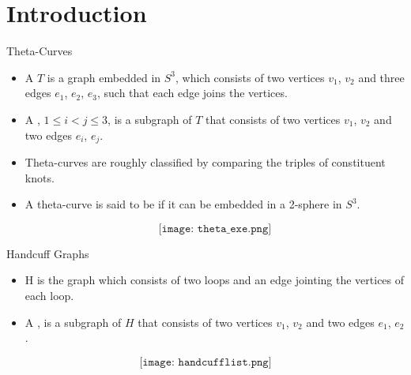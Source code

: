 \section{Introduction}
\begin{frame}{Theta-Curves}
	\begin{itemize}
		\item A  $T$ is a graph embedded in $S^3$,
		which consists of two vertices $v_1$, $v_2$
		and three edges $e_1$, $e_2$, $e_3$,
		such that each edge joins the vertices.
		\item A , $1 \le i < j \le 3$, is a subgraph of $T$
		that consists of two vertices $v_1$, $v_2$ and two edges $e_i$, $e_j$.
		
		\item Theta-curves are roughly classified by comparing the triples of constituent knots.
		
		\item A theta-curve is said to be  if it can be embedded in a 2-sphere in $S^3$.

		$$\texttt{[image: theta\_exe.png]}$$
	\end{itemize}
\end{frame}

\begin{frame}{Handcuff Graphs}
	\begin{itemize}
		\item {} H is the graph which consists of two loops and an edge jointing the vertices of each loop.
		\item A , is a subgraph of $H$
		that consists of two vertices $v_1$, $v_2$ and two edges $e_1$, $e_2$.

	\end{itemize}

	$$\texttt{[image: handcufflist.png]}$$
\end{frame}

